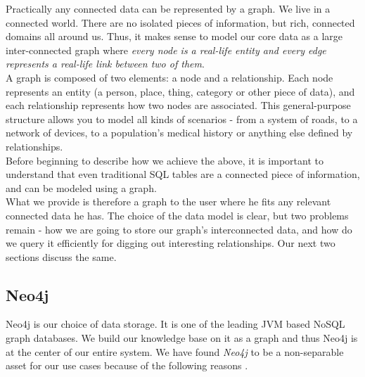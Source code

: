 Practically any connected data can be represented by a graph. We live in a connected world. There are no isolated pieces of information, but rich, connected domains all around us. Thus, it makes sense to model our core data as a large inter-connected graph where \emph{every node is a real-life entity and every edge represents a real-life link between two of them}.   \\



A graph is composed of two elements: a node and a relationship. Each node represents an entity (a person, place, thing, category or other piece of data), and each relationship represents how two nodes are associated. This general-purpose structure allows you to model all kinds of scenarios - from a system of roads, to a network of devices, to a population's medical history or anything else defined by relationships.  \\

Before beginning to describe how we achieve the above, it is important to understand that even traditional SQL tables are a connected piece of information, and can be modeled using a graph. \\

What we provide is therefore a graph to the user where he fits any relevant connected data he has. The choice of the data model is clear, but two problems remain - how we are going to store our graph's interconnected data, and how do we query it efficiently for digging out interesting relationships. Our next two sections discuss the same. \\

\subsection{Neo4j}

Neo4j \cite{neo}  is our choice of data storage. It is one of the leading JVM based NoSQL graph databases. We build our knowledge base on it as a graph and thus Neo4j is at the center of our entire system. We have found \emph{Neo4j} to be a non-separable asset for our use cases because of the following reasons \cite{neogdb}. \\

